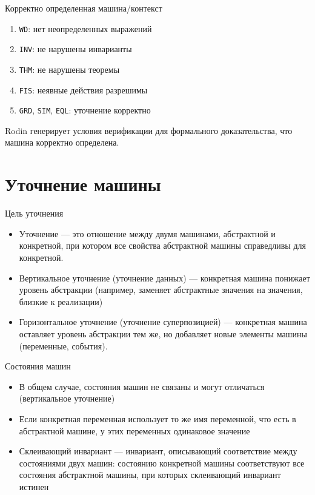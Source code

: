 \documentclass[hyperref={unicode=true}]{beamer}
\begin{document}
	\begin{frame}{Корректно определенная машина/контекст}
		\begin{enumerate}
			\item \texttt{WD}: нет неопределенных выражений
			\item \texttt{INV}: не нарушены инварианты
			\item \texttt{THM}: не нарушены теоремы
			\item \texttt{FIS}: неявные действия разрешимы
			\item \texttt{GRD}, \texttt{SIM}, \texttt{EQL}:
			      уточнение корректно
		\end{enumerate}

		Rodin генерирует условия верификации для формального
		доказательства, что машина корректно определена.
	\end{frame}

    \section{Уточнение машины}

    \begin{frame}{Цель уточнения}
        \begin{itemize}

        \item
        Уточнение --- это отношение между двумя машинами,
        абстрактной и конкретной, при котором все свойства
        абстрактной машины справедливы для конкретной.

        \item
        Вертикальное уточнение (уточнение данных) --- конкретная
        машина понижает уровень абстракции (например, заменяет
        абстрактные значения на значения, близкие к реализации)

        \item
        Горизонтальное уточнение (уточнение суперпозицией) ---
        конкретная машина оставляет уровень абстракции тем же,
        но добавляет новые элементы машины (переменные, события). 
        \end{itemize}
    \end{frame}

    \begin{frame}{Состояния машин}
        \begin{itemize}
            \item В общем случае, состояния машин не связаны
            и могут отличаться (вертикальное уточнение)
            \item Если конкретная переменная использует то же
            имя переменной, что есть в абстрактной машине, у этих
            переменных одинаковое значение
            \item Склеивающий инвариант --- инвариант, описывающий
            соответствие между состояниями двух машин: состоянию
            конкретной машины соответствуют все состояния абстрактной
            машины, при которых склеивающий инвариант истинен
        \end{itemize}
    \end{frame}
\end{document}
